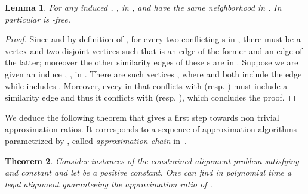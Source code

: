 \documentclass[final]{dmtcs-episciences}
\newtheorem{theorem}{Theorem}
\newtheorem{lemma}[theorem]{Lemma}
\newcommand\mar[1]{\textcolor{black}{#1}}
\begin{document}
\begin{lemma}\label{lem:P_4-new}
For any induced , \mar{}, in ,  and  have the same neighborhood  in . In particular  is -free.
\end{lemma}

\begin{proof}
 Since  and by definition of , for every two conflicting s in , there must be   a vertex  and two disjoint vertices  such that  is an edge of the former and  an edge of the latter; moreover the other similarity edges of these s are in . Suppose we are given an induce , , in 
 . There are such vertices , where  and  both include the edge  while  includes . Moreover, every  in   that conflicts  \mar{with}  (resp. ) must include a similarity  edge  and thus it conflicts \mar{with}  (resp. ), which concludes the proof.\end{proof}

We deduce the following theorem that gives a first step towards non trivial  approximation ratios. It corresponds to a sequence of approximation algorithms parametrized by , called {\em approximation chain} in~\citet{demange-chain}.

\begin{theorem}\label{th:approxlog}
Consider instances of the constrained alignment problem satisfying  and  constant and let  be a positive constant. One can find in polynomial time a legal alignment guaranteeing the approximation ratio of .
\end{theorem}
\end{document}
